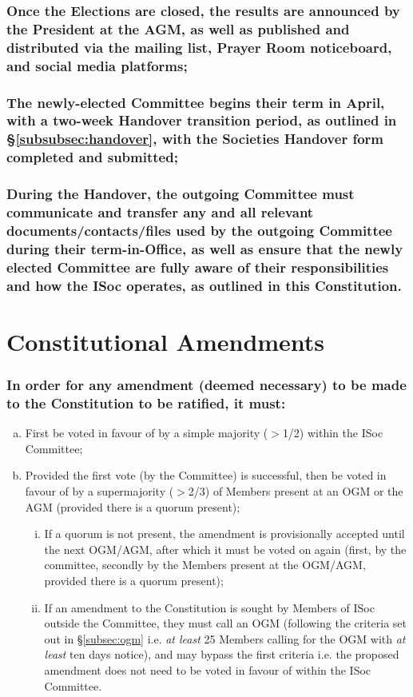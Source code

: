 \documentclass[12pt]{article}
\newcommand\invisiblesubsection[1]{%
  \refstepcounter{subsection}%
  \addcontentsline{toc}{subsection}{\protect\numberline{\thesubsection}#1}%
  \subsectionmark{#1}}
\newcommand{\nocontentsline}[3]{}
\newcommand{\tocless}[2]{\bgroup\let\addcontentsline=\nocontentsline#1{#2}\egroup}
\begin{document}
\subsubsection{Once the Elections are closed, the results are announced by the President at the AGM, as well as published and distributed via the mailing list, Prayer Room noticeboard, and social media platforms;}
\subsubsection{The newly-elected Committee begins their term in April, with a two-week Handover transition period, as outlined in \S\ref{subsubsec:handover}, with the Societies Handover form completed and submitted;}
\subsubsection{During the Handover, the outgoing Committee must communicate and transfer any and all relevant documents/contacts/files used by the outgoing Committee during their term-in-Office, as well as ensure that the newly elected Committee are fully aware of their responsibilities and how the ISoc operates, as outlined in this Constitution.}
\hspace{1pt}

\section{Constitutional Amendments}
\tocless\invisiblesubsection{}
\setcounter{subsection}{0}

\subsubsection{In order for any amendment (deemed necessary) to be made to the Constitution to be ratified, it must:}
\begin{displayquote}
\begin{enumerate}[a.]
\item First be voted in favour of by a simple majority ($>$1/2) within the ISoc Committee;
\item Provided the first vote (by the Committee) is successful, then be voted in favour of by a supermajority ($>$2/3) of Members present at an OGM or the AGM (provided there is a quorum present);
\begin{enumerate}[i.]
\item If a quorum is not present, the amendment is provisionally accepted until the next OGM/AGM, after which it must be voted on again (first, by the committee, secondly by the Members present at the OGM/AGM, provided there is a quorum present);
\item If an amendment to the Constitution is sought by Members of ISoc outside the Committee, they must call an OGM (following the criteria set out in \S\ref{subsec:ogm} i.e. \emph{at least} 25 Members calling for the OGM with \emph{at least} ten days notice), and may bypass the first criteria i.e. the proposed amendment does not need to be voted in favour of within the ISoc Committee.
\end{enumerate}
\end{enumerate}
\end{displayquote}
\end{document}
